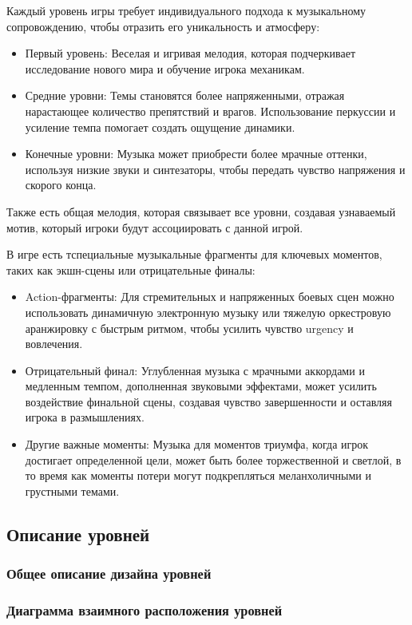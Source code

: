 \documentclass[a4paper,12pt]{article}
\begin{document}
Каждый уровень игры требует индивидуального подхода к музыкальному сопровождению, чтобы отразить его уникальность и атмосферу:
\begin{itemize}
    \item Первый уровень: Веселая и игривая мелодия, которая подчеркивает исследование нового мира и обучение игрока механикам.
    \item Средние уровни: Темы становятся более напряженными, отражая нарастающее количество препятствий и врагов. Использование перкуссии и усиление темпа помогает создать ощущение динамики.
    \item Конечные уровни: Музыка может приобрести более мрачные оттенки, используя низкие звуки и синтезаторы, чтобы передать чувство напряжения и скорого конца.
\end{itemize}
Также есть общая мелодия, которая связывает все уровни, создавая узнаваемый мотив, который игроки будут ассоциировать с данной игрой.


В игре есть тспециальные музыкальные фрагменты для ключевых моментов, таких как экшн-сцены или отрицательные финалы:
\begin{itemize}
    \item Action-фрагменты: Для стремительных и напряженных боевых сцен можно использовать динамичную электронную музыку или тяжелую оркестровую аранжировку с быстрым ритмом, чтобы усилить чувство urgency и вовлечения.
    \item Отрицательный финал: Углубленная музыка с мрачными аккордами и медленным темпом, дополненная звуковыми эффектами, может усилить воздействие финальной сцены, создавая чувство завершенности и оставляя игрока в размышлениях.
    \item Другие важные моменты: Музыка для моментов триумфа, когда игрок достигает определенной цели, может быть более торжественной и светлой, в то время как моменты потери могут подкрепляться меланхоличными и грустными темами.
\end{itemize}

\subsection{Описание уровней}
\subsubsection{Общее описание дизайна уровней}
\subsubsection{Диаграмма взаимного расположения уровней}
\end{document}
